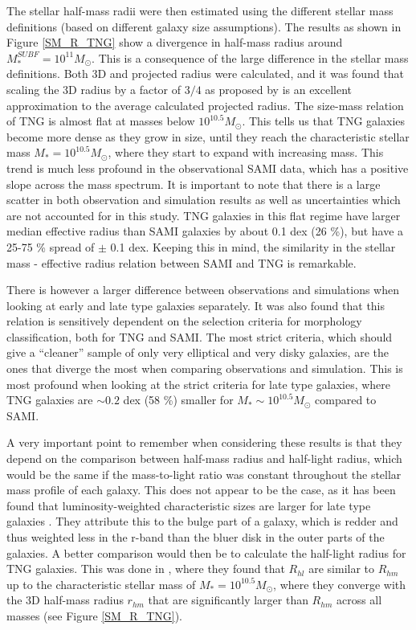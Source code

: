 The stellar half-mass radii were then estimated using the different stellar mass definitions (based on different galaxy size assumptions). The results as shown in Figure \ref{SM_R_TNG} show a divergence in half-mass radius around $M^{SUBF}_\ast = 10^{11} M_\odot$. This is a consequence of the large difference in the stellar mass definitions. Both 3D and projected radius were calculated, and it was found that scaling the 3D radius by a factor of $3/4$ as proposed by \textcite{Wolf2010} is an excellent approximation to the average calculated projected radius. 
The size-mass relation of TNG is almost flat at masses below $10^{10.5} M_{\odot}$. This tells us that TNG galaxies become more dense as they grow in size, until they reach the characteristic stellar mass $M_\ast = 10^{10.5} M_{\odot}$, where they start to expand with increasing mass. This trend is much less profound in the observational SAMI data, which has a positive slope across the mass spectrum. It is important to note that there is a large scatter in both observation and simulation results as well as uncertainties which are not accounted for in this study. TNG galaxies in this flat regime have larger median effective radius than SAMI galaxies by about 0.1 dex (26 \%), but have a 25-75 \% spread of $\pm$ 0.1 dex. Keeping this in mind, the similarity in the stellar mass - effective radius relation between SAMI and TNG is remarkable. 

There is however a larger difference between observations and simulations when looking at early and late type galaxies separately. It was also found that this relation is sensitively dependent on the selection criteria for morphology classification, both for TNG and SAMI. The most strict criteria, which should give a ``cleaner'' sample of only very elliptical and very disky galaxies, are the ones that diverge the most when comparing observations and simulation. This is most profound when looking at the strict criteria for late type galaxies, where TNG galaxies are $\sim 0.2$ dex (58 \%) smaller for $M_\ast \sim 10^{10.5} M_\odot$ compared to SAMI.

A very important point to remember when considering these results is that they depend on the comparison between half-mass radius and half-light radius, which would be the same if the mass-to-light ratio was constant throughout the stellar mass profile of each galaxy. This does not appear to be the case, as it has been found that luminosity-weighted characteristic sizes are larger for late type galaxies \parencite{Sande2018}. They attribute this to the bulge part of a galaxy, which is redder and thus weighted less in the r-band than the bluer disk in the outer parts of the galaxies. A better comparison would then be to calculate the half-light radius for TNG galaxies. This was done in \textcite{Genel2017}, where they found that $R_{hl}$ are similar to $R_{hm}$ up to the characteristic stellar mass of $M_\ast = 10^{10.5} M_\odot$, where they converge with the 3D half-mass radius $r_{hm}$ that are significantly larger than $R_{hm}$ across all masses (see Figure \ref{SM_R_TNG}).


